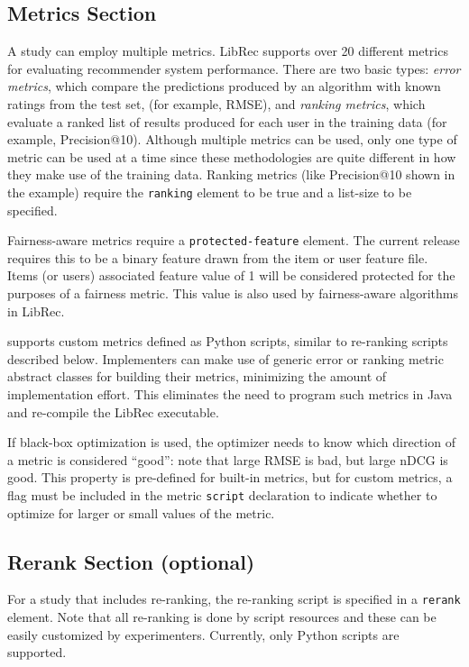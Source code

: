 \subsection{Metrics Section}
\label{subsec:libauto_metrics}

A study can employ multiple metrics. LibRec supports over 20 different metrics for evaluating recommender system performance. There are two basic types: \textit{error metrics}, which compare the predictions produced by an algorithm with known ratings from the test set, (for example, RMSE), and \textit{ranking metrics}, which evaluate a ranked list of results produced for each user in the training data (for example, Precision@10). Although multiple metrics can be used, only one type of metric can be used at a time since these methodologies are quite different in how they make use of the training data. Ranking metrics (like Precision@10 shown in the example) require the \texttt{ranking} element to be true and a list-size to be specified.

Fairness-aware metrics require a \texttt{protected-feature} element. The current release requires this to be a binary feature drawn from the item or user feature file. Items (or users) associated feature value of 1 will be considered protected for the purposes of a fairness metric. This value is also used by fairness-aware algorithms in LibRec.

\libauto{} supports custom metrics defined as Python scripts, similar to re-ranking scripts described below. Implementers can make use of generic error or ranking metric abstract classes for building their metrics, minimizing the amount of implementation effort. This eliminates the need to program such metrics in Java and re-compile the LibRec executable.

If black-box optimization is used, the optimizer needs to know which direction of a metric is considered ``good'': note that large RMSE is bad, but large nDCG is good. This property is pre-defined for built-in metrics, but for custom metrics, a flag must be included in the metric \texttt{script} declaration to indicate whether to optimize for larger or small values of the metric.  

\subsection{Rerank Section (optional)}
\label{subsec:re-ra}
For a study that includes re-ranking, the re-ranking script is specified in a \texttt{rerank} element. Note that all re-ranking is done by script resources and these can be easily customized by experimenters. Currently, only Python scripts are supported.

